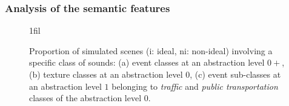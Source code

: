 \documentclass[12pt]{elsarticle}
\makeatletter
\newcommand*{\centerfloat}{%
  \parindent \z@
  \leftskip \z@ \@plus 1fil \@minus \textwidth
  \rightskip\leftskip
  \parfillskip \z@skip}
\makeatother
\begin{document}

\subsubsection*{Analysis of the semantic features}

\begin{figure}[!tp]
  \centerfloat

                             \caption{Proportion of simulated scenes (i: ideal, ni: non-ideal) involving a specific class of sounds: (a) event classes at an abstraction level $0+$, (b) texture classes at an abstraction level $0$, (c) event sub-classes at an abstraction level $1$ belonging to \emph{traffic} and \emph{public transportation} classes of the abstraction level $0$. }\label{fig:soundsource}
\end{figure}
\end{document}

